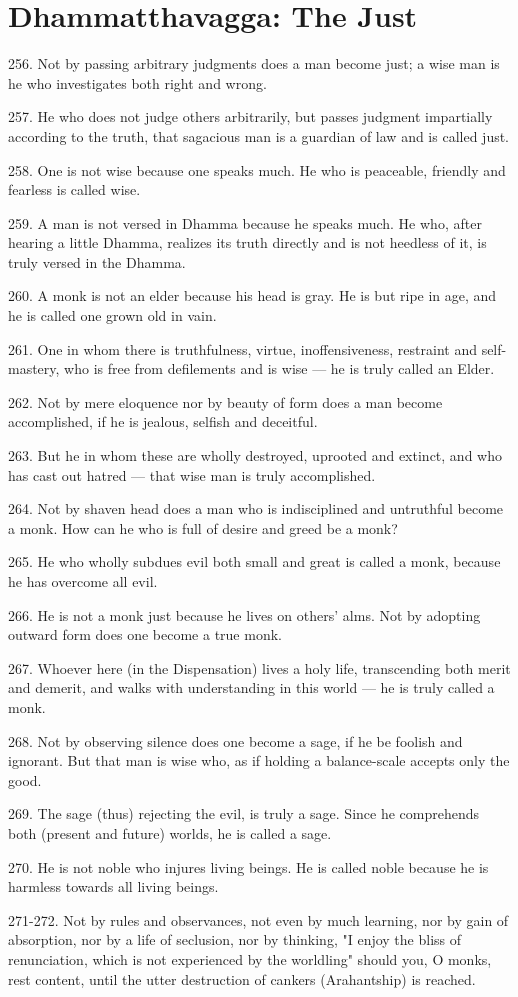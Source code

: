 \newpage
\chapter{Dhammatthavagga: The Just}
256. Not by passing arbitrary judgments does a man become just; a wise man is he who investigates both right and wrong.

257. He who does not judge others arbitrarily, but passes judgment impartially according to the truth, that sagacious man is a guardian of law and is called just.

258. One is not wise because one speaks much. He who is peaceable, friendly and fearless is called wise.

259. A man is not versed in Dhamma because he speaks much. He who, after hearing a little Dhamma, realizes its truth directly and is not heedless of it, is truly versed in the Dhamma.

260. A monk is not an elder because his head is gray. He is but ripe in age, and he is called one grown old in vain.

261. One in whom there is truthfulness, virtue, inoffensiveness, restraint and self-mastery, who is free from defilements and is wise — he is truly called an Elder.

262. Not by mere eloquence nor by beauty of form does a man become accomplished, if he is jealous, selfish and deceitful.

263. But he in whom these are wholly destroyed, uprooted and extinct, and who has cast out hatred — that wise man is truly accomplished.

264. Not by shaven head does a man who is indisciplined and untruthful become a monk. How can he who is full of desire and greed be a monk?

265. He who wholly subdues evil both small and great is called a monk, because he has overcome all evil.

266. He is not a monk just because he lives on others' alms. Not by adopting outward form does one become a true monk.

267. Whoever here (in the Dispensation) lives a holy life, transcending both merit and demerit, and walks with understanding in this world — he is truly called a monk.

268. Not by observing silence does one become a sage, if he be foolish and ignorant. But that man is wise who, as if holding a balance-scale accepts only the good.

269. The sage (thus) rejecting the evil, is truly a sage. Since he comprehends both (present and future) worlds, he is called a sage.

270. He is not noble who injures living beings. He is called noble because he is harmless towards all living beings.

271-272. Not by rules and observances, not even by much learning, nor by gain of absorption, nor by a life of seclusion, nor by thinking, "I enjoy the bliss of renunciation, which is not experienced by the worldling" should you, O monks, rest content, until the utter destruction of cankers (Arahantship) is reached.
